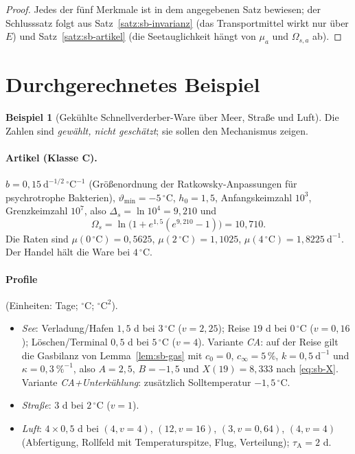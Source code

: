 \documentclass[a4paper, 12pt, twoside, openright]{report}
\theoremstyle{definition}
\theoremstyle{definition}
\newtheorem{beispiel}{Beispiel}[chapter]
\begin{document}
\begin{proof}
Jedes der fünf Merkmale ist in dem angegebenen Satz bewiesen; der Schlusssatz folgt aus
Satz~\ref{satz:sb-invarianz} (das Transportmittel wirkt nur über $E$) und Satz~\ref{satz:sb-artikel}
(die Seetauglichkeit hängt von $\mu_a$ und $\Omega_{s,a}$ ab).
\end{proof}

\section{Durchgerechnetes Beispiel}
\label{sec:sb-beispiel}

\begin{beispiel}[Gekühlte Schnellverderber-Ware über Meer, Straße und Luft]\label{bsp:sb-modi}
Die Zahlen sind \emph{gewählt, nicht geschätzt}; sie sollen den Mechanismus zeigen.

\paragraph{Artikel (Klasse C).} $b=0{,}15\ \mathrm d^{-1/2}\,{}^\circ\mathrm C^{-1}$ (Größenordnung der
Ratkowsky-Anpassungen für psychrotrophe Bakterien), $\vartheta_{\min}=-5\,{}^\circ$C,
$h_0=1{,}5$, Anfangskeimzahl $10^3$, Grenzkeimzahl $10^7$, also $\Delta_s=\ln10^4=9{,}210$ und
\[
  \Omega_s=\ln\bigl(1+e^{1{,}5}(e^{9{,}210}-1)\bigr)=10{,}710.
\]
Die Raten sind $\mu(0\,{}^\circ\mathrm C)=0{,}5625$, $\mu(2\,{}^\circ\mathrm C)=1{,}1025$,
$\mu(4\,{}^\circ\mathrm C)=1{,}8225\ \mathrm d^{-1}$. Der Handel hält die Ware bei $4\,{}^\circ$C.

\paragraph{Profile} (Einheiten: Tage; ${}^\circ$C; ${}^\circ\mathrm C^2$).
\begin{itemize}
  \item \emph{See}: Verladung/Hafen $1{,}5$ d bei $3\,{}^\circ$C ($v=2{,}25$); Reise $19$ d bei
    $0\,{}^\circ$C ($v=0{,}16$); Löschen/Terminal $0{,}5$ d bei $5\,{}^\circ$C ($v=4$).
    Variante \emph{CA}: auf der Reise gilt die Gasbilanz von Lemma~\ref{lem:sb-gas} mit
    $c_0=0$, $c_\infty=5\,\%$, $k=0{,}5\ \mathrm d^{-1}$ und $\kappa=0{,}3\ \%^{-1}$, also
    $A=2{,}5$, $B=-1{,}5$ und $X(19)=8{,}333$ nach \eqref{eq:sb-X}. Variante \emph{CA+Unterkühlung}:
    zusätzlich Solltemperatur $-1{,}5\,{}^\circ$C.
  \item \emph{Straße}: $3$ d bei $2\,{}^\circ$C ($v=1$).
  \item \emph{Luft}: $4\times0{,}5$ d bei $(4,v{=}4)$, $(12,v{=}16)$, $(3,v{=}0{,}64)$, $(4,v{=}4)$
    (Abfertigung, Rollfeld mit Temperaturspitze, Flug, Verteilung); $\tau_{\mathrm A}=2$ d.
\end{itemize}


\end{beispiel}
\end{document}
